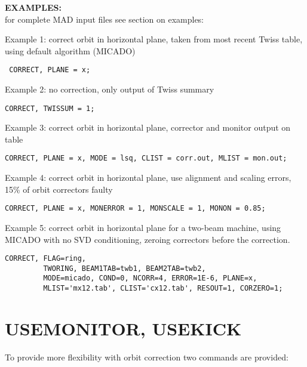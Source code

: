 \textbf{EXAMPLES:}\\ 
for complete MAD input files see section on examples:

Example 1: correct orbit in horizontal plane, taken from most recent
Twiss table, using default algorithm (MICADO)
\begin{verbatim}
 CORRECT, PLANE = x; 
\end{verbatim}

Example 2: no correction, only output of Twiss summary 
\begin{verbatim}
CORRECT, TWISSUM = 1; 
\end{verbatim}

Example 3: correct orbit in horizontal plane, corrector and monitor
output on table 
\begin{verbatim}
CORRECT, PLANE = x, MODE = lsq, CLIST = corr.out, MLIST = mon.out;   
\end{verbatim}

Example 4: correct orbit in horizontal plane, use alignment and scaling
errors, 15\% of orbit correctors faulty
\begin{verbatim}
CORRECT, PLANE = x, MONERROR = 1, MONSCALE = 1, MONON = 0.85; 
\end{verbatim}

Example 5: correct orbit in horizontal plane for a two-beam machine,
using MICADO with no SVD conditioning, zeroing correctors before the
correction. 
\begin{verbatim}
CORRECT, FLAG=ring,
         TWORING, BEAM1TAB=twb1, BEAM2TAB=twb2,
         MODE=micado, COND=0, NCORR=4, ERROR=1E-6, PLANE=x,
         MLIST='mx12.tab', CLIST='cx12.tab', RESOUT=1, CORZERO=1;
\end{verbatim}




%
\section{USEMONITOR, USEKICK}
\label{sec:activate}
To provide more flexibility with orbit correction two commands are
provided:  


